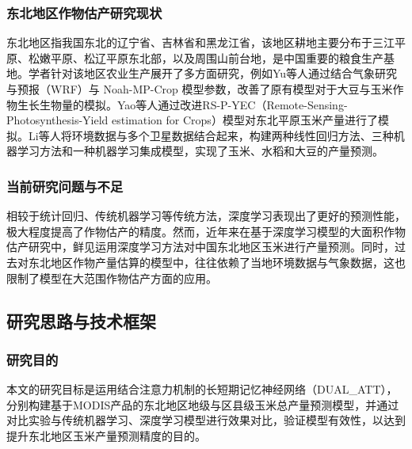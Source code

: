 \subsubsection{东北地区作物估产研究现状}

\par 东北地区指我国东北的辽宁省、吉林省和黑龙江省，该地区耕地主要分布于三江平原、松嫩平原、松辽平原东北部，以及周围山前台地，是中国重要的粮食生产基地。学者针对该地区农业生产展开了多方面研究，例如Yu等人通过结合气象研究与预报（WRF）与 Noah-MP-Crop 模型参数，改善了原有模型对于大豆与玉米作物生长生物量的模拟\cite{YU2022107323}。Yao等人通过改进RS-P-YEC（Remote-Sensing-Photosynthesis-Yield estimation for Crops）模型对东北平原玉米产量进行了模拟\cite{yao2015estimation}。Li等人将环境数据与多个卫星数据结合起来，构建两种线性回归方法、三种机器学习方法和一种机器学习集成模型，实现了玉米、水稻和大豆的产量预测\cite{li2022exploring}。

\subsubsection{当前研究问题与不足}
\par 相较于统计回归、传统机器学习等传统方法，深度学习表现出了更好的预测性能，极大程度提高了作物估产的精度。然而，近年来在基于深度学习模型的大面积作物估产研究中，鲜见运用深度学习方法对中国东北地区玉米进行产量预测。同时，过去对东北地区作物产量估算的模型中，往往依赖了当地环境数据与气象数据，这也限制了模型在大范围作物估产方面的应用。

\subsection{研究思路与技术框架}

\subsubsection{研究目的}
\par 本文的研究目标是运用结合注意力机制的长短期记忆神经网络（DUAL\_ATT），分别构建基于MODIS产品的东北地区地级与区县级玉米总产量预测模型，并通过对比实验与传统机器学习、深度学习模型进行效果对比，验证模型有效性，以达到提升东北地区玉米产量预测精度的目的。

